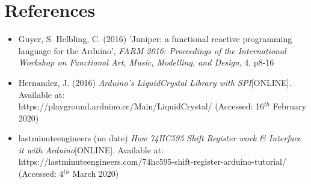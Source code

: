 \documentclass{article}
\begin{document}
\section*{References}
\begin{itemize}
  \item Guyer, S. Helbling, C. (2016) 'Juniper: a functional reactive programming language for the Arduino', \textit{FARM 2016: Proceedings of the International Workshop on Functional Art, Music, Modelling, and Design}, 4, p8-16

  \item Hernandez, J. (2016) \textit{Arduino's LiquidCrystal Library with SPI}[ONLINE]. Available at: \\https://playground.arduino.cc/Main/LiquidCrystal/ (Accessed: 16$^{th}$ February 2020)

  \item lastminuteengineers (no date) \textit{How 74HC595 Shift Register work \& Interface it with Arduino}[ONLINE]. Available at: https://lastminuteengineers.com/74hc595-shift-register-arduino-tutorial/ (Accessed: 4$^{th}$ March 2020)
\end{itemize}
\end{document}
